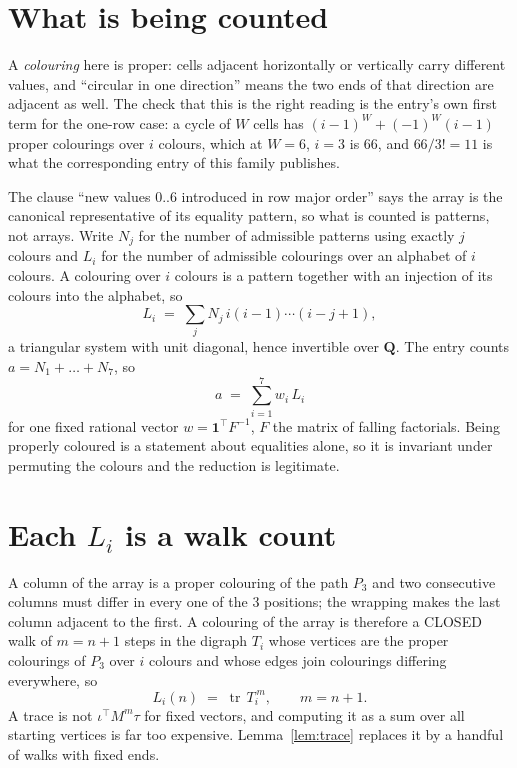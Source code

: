 \documentclass[11pt,a4paper]{article}
\theoremstyle{plain}
\theoremstyle{definition}
\begin{document}
\section{What is being counted}

A \emph{colouring} here is proper: cells adjacent horizontally or vertically carry different
values, and ``circular in one direction'' means the two ends of that direction are adjacent as
well. The check that this is the right reading is the entry's own first term for the
one-row case: a cycle of $W$ cells has $(i-1)^W+(-1)^W(i-1)$ proper colourings over $i$
colours, which at $W=6$, $i=3$ is $66$, and $66/3!=11$ is what the corresponding entry of this
family publishes.

The clause ``new values $0..6$ introduced in row major order'' says the array is the
canonical representative of its equality pattern, so what is counted is patterns, not arrays.
Write $N_j$ for the number of admissible patterns using exactly $j$ colours and $L_i$ for the
number of admissible colourings over an alphabet of $i$ colours. A colouring over $i$ colours
is a pattern together with an injection of its colours into the alphabet, so
\[
L_i\;=\;\sum_j N_j\,i(i-1)\cdots(i-j+1),
\]
a triangular system with unit diagonal, hence invertible over $\mathbf{Q}$. The entry counts
$a=N_1+\dots+N_{7}$, so
\[
a\;=\;\sum_{i=1}^{7}w_i\,L_i
\]
for one fixed rational vector $w=\mathbf{1}^{\!\top}F^{-1}$, $F$ the matrix of falling
factorials. Being properly coloured is a statement about equalities alone, so it is invariant
under permuting the colours and the reduction is legitimate.

\section{Each $L_i$ is a walk count}

A column of the array is a proper colouring of the path $P_{3}$ and two consecutive
columns must differ in every one of the $3$ positions; the wrapping makes the last column
adjacent to the first. A colouring of the array is therefore a CLOSED walk of $m=n+1$ steps
in the digraph $T_i$ whose vertices are the proper colourings of $P_{3}$ over $i$ colours
and whose edges join colourings differing everywhere, so
\[
L_i(n)\;=\;\operatorname{tr}\,T_i^{\,m},\qquad m=n+1.
\]
A trace is not $\iota^{\!\top}M^m\tau$ for fixed vectors, and computing it as a sum over all
starting vertices is far too expensive. Lemma~\ref{lem:trace} replaces it by a handful of
walks with fixed ends.
\end{document}
